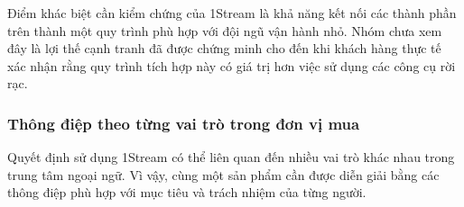 Điểm khác biệt cần kiểm chứng của 1Stream là khả năng kết nối các thành phần trên thành một quy trình phù hợp với đội ngũ vận hành nhỏ. Nhóm chưa xem đây là lợi thế cạnh tranh đã được chứng minh cho đến khi khách hàng thực tế xác nhận rằng quy trình tích hợp này có giá trị hơn việc sử dụng các công cụ rời rạc.

\subsubsection{Thông điệp theo từng vai trò trong đơn vị mua}

Quyết định sử dụng 1Stream có thể liên quan đến nhiều vai trò khác nhau trong trung tâm ngoại ngữ. Vì vậy, cùng một sản phẩm cần được diễn giải bằng các thông điệp phù hợp với mục tiêu và trách nhiệm của từng người.

